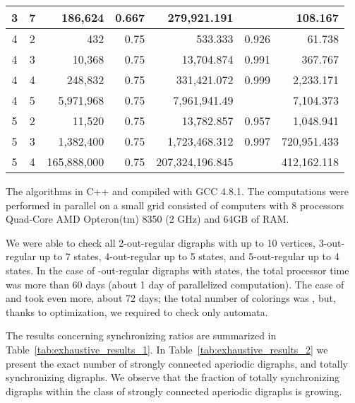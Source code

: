 \documentclass[runningheads]{llncs}
\begin{document}
\begin{table}
\begin{center}
\begin{tabular}{|c|c|r|r|r|r|r|}
  3 & 7  & 186,624    & 0.667     & 279,921.191     &  & 108.167  \\ \hline 
  4 & 2  & 432        & 0.75      & 533.333         & 0.926           & 61.738  \\ \hline  
  4 & 3  & 10,368     & 0.75      & 13,704.874      & 0.991           & 367.767  \\ \hline
  4 & 4  & 248,832    & 0.75      & 331,421.072     & 0.999           & 2,233.171  \\ \hline
  4 & 5  & 5,971,968  & 0.75      & 7,961,941.49    &  & 7,104.373  \\ \hline
  5 & 2  & 11,520     & 0.75      & 13,782.857      & 0.957           & 1,048.941  \\ \hline  
  5 & 3  & 1,382,400  & 0.75      & 1,723,468.312   & 0.997           & 720,951.433  \\ \hline
  5 & 4  & 165,888,000& 0.75      & 207,324,196.845 &  & 412,162.118  \\ \hline
\end{tabular}
\end{center}
\end{table}

The algorithms in C++ and compiled with GCC 4.8.1.
The computations were performed in parallel on a small grid consisted of computers with 8 processors Quad-Core AMD Opteron(tm) 8350 (2 GHz) and 64GB of RAM.

We were able to check all 2-out-regular digraphs with up to 10 vertices, 3-out-regular up to 7 states, 4-out-regular up to 5 states, and 5-out-regular up to 4 states.
In the case of -out-regular digraphs with  states, the total processor time was more than 60 days (about 1 day of parallelized computation).
The case of  and  took even more, about 72 days; the total number of colorings was , but, thanks to optimization, we required to check only  automata.

The results concerning synchronizing ratios are summarized in Table~\ref{tab:exhaustive_results_1}.
In Table~\ref{tab:exhaustive_results_2} we present the exact number of strongly connected aperiodic digraphs, and totally synchronizing digraphs.
We observe that the fraction of totally synchronizing digraphs within the class of strongly connected aperiodic digraphs is growing.
\end{document}
